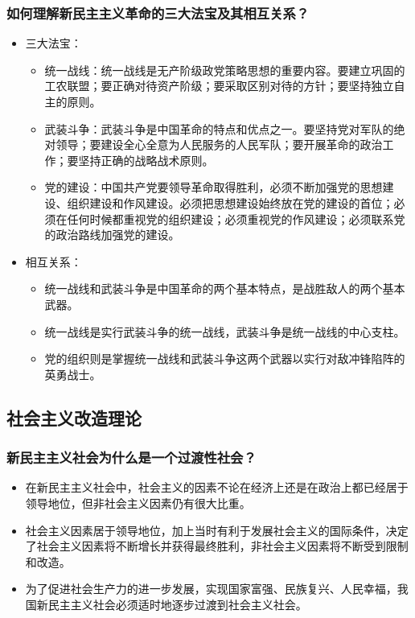 \documentclass{article}
\begin{document}
\subsubsection{如何理解新民主主义革命的三大法宝及其相互关系？}
\begin{itemize}
    \item 三大法宝：
    \begin{itemize}
        \item 统一战线：统一战线是无产阶级政党策略思想的重要内容。要建立巩固的工农联盟；要正确对待资产阶级；要采取区别对待的方针；要坚持独立自主的原则。
        \item 武装斗争：武装斗争是中国革命的特点和优点之一。要坚持党对军队的绝对领导；要建设全心全意为人民服务的人民军队；要开展革命的政治工作；要坚持正确的战略战术原则。
        \item 党的建设：中国共产党要领导革命取得胜利，必须不断加强党的思想建设、组织建设和作风建设。必须把思想建设始终放在党的建设的首位；必须在任何时候都重视党的组织建设；必须重视党的作风建设；必须联系党的政治路线加强党的建设。
    \end{itemize}
    \item 相互关系：
    \begin{itemize}
        \item 统一战线和武装斗争是中国革命的两个基本特点，是战胜敌人的两个基本武器。
        \item 统一战线是实行武装斗争的统一战线，武装斗争是统一战线的中心支柱。
        \item 党的组织则是掌握统一战线和武装斗争这两个武器以实行对敌冲锋陷阵的英勇战士。
    \end{itemize}
\end{itemize}

\subsection{社会主义改造理论}

\subsubsection{新民主主义社会为什么是一个过渡性社会？}
\begin{itemize}
    \item 在新民主主义社会中，社会主义的因素不论在经济上还是在政治上都已经居于领导地位，但非社会主义因素仍有很大比重。
    \item 社会主义因素居于领导地位，加上当时有利于发展社会主义的国际条件，决定了社会主义因素将不断增长并获得最终胜利，非社会主义因素将不断受到限制和改造。
    \item 为了促进社会生产力的进一步发展，实现国家富强、民族复兴、人民幸福，我国新民主主义社会必须适时地逐步过渡到社会主义社会。
\end{itemize}
\end{document}
